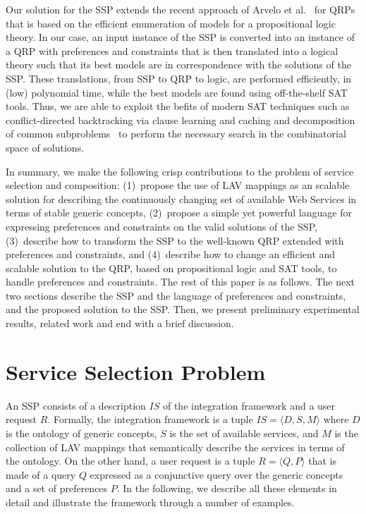 \documentclass{llncs}
\newcommand{\tup}[1]{\langle #1 \rangle}
\begin{document}
Our solution for the SSP extends the recent approach of Arvelo et
al.~\cite{arvelo:aaai06} for QRPs that is based on the efficient 
enumeration of models for a propositional logic theory.
In our case, an input instance of the SSP is converted into an instance
of a QRP with preferences and constraints that is then translated
into a logical theory such that its best models are in correspondence
with the solutions of the SSP. These translations, from SSP to QRP to
logic, are performed efficiently, in (low) polynomial time, while the
best models are found using off-the-shelf SAT tools.
Thus, we are able to exploit the befits of modern SAT techniques such
as conflict-directed backtracking via clause learning and caching and
decomposition of common subproblems~\cite{beame:understanding} to
perform the necessary search in the combinatorial space of solutions.

In summary, we make the following crisp contributions to the problem of 
service selection and composition: (1)~propose the use of LAV mappings
as an scalable solution for describing the continuously changing set
of available Web Services in terms of stable generic concepts,
(2)~propose a simple yet powerful language for expressing preferences
and constraints on the valid solutions of the SSP, 
(3)~describe how to transform the SSP to the well-known QRP extended with
preferences and constraints, and
(4)~describe how to change an efficient and scalable solution to the QRP,
based on propositional logic and SAT tools, to handle preferences and constraints.
The rest of this paper is as follows. The next two sections describe the
SSP and the language of preferences and constraints, and the proposed solution to the SSP.
Then, we present preliminary experimental results, related work 
and end with a brief discussion.

\section{Service Selection Problem}

An SSP consists of a description $IS$ of the integration framework
and a user request $R$.
Formally, the integration framework is a tuple $IS=\tup{D,S,M}$
where $D$ is the ontology of generic concepts, $S$ is the set
of available services, and $M$ is the collection of LAV mappings that
semantically describe the services in terms of the ontology.
On the other hand, a user request is a tuple $R=\tup{Q,P}$
that is made of a query $Q$ expressed as a conjunctive query over
the generic concepts and a set of preferences $P$.
In the following, we describe all these elements in detail and
illustrate the framework through a number of examples.
\end{document}
